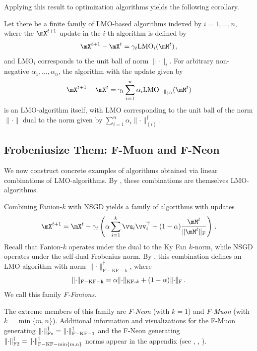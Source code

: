 \documentclass[pmlr]{jmlr}%
\newcommand{\norm}[1]{\lVert #1\rVert}
\DeclarePairedDelimiter{\normf}{\|}{\|_\mathrm{F}}
\DeclarePairedDelimiter{\normkfk}{\|}{\|_{\text{KF-}k}}
\DeclarePairedDelimiter{\normfstar}{\|}{\|_\mathrm{F*}}
\DeclarePairedDelimiter{\normftwo}{\|}{\|_\mathrm{F2}}
\begin{document}
 Applying this result to optimization algorithms yields the following corollary.
 
 \begin{corollary}\label{corollary:lin_comb_alg}
   Let there be a finite family of LMO-based algorithms indexed by $i = 1,\dots,n$, where the $\mX^{t + 1}$ update in the $i$-th algorithm is defined by
   \[
   \mX^{t + 1} - \mX^{t} = \gamma_t \mathrm{LMO}_{i}(\mM^{t})\,,
   \]
   and $\mathrm{LMO}_i$ corresponds to the unit ball of norm $\norm{\cdot}_i$. For arbitrary non-negative $\alpha_1,\dots,\alpha_n$, the algorithm with the update given by
   \[
   \mX^{t + 1} - \mX^{t} = \gamma_t \sum_{i = 1}^n \alpha_i \mathrm{LMO}_{\norm{\cdot}_{(i)}}(\mM^t)
   \]
   is an LMO-algorithm itself, with LMO corresponding to the unit ball of the norm $\norm{\cdot}$ dual to the norm given by $\sum_{i = 1}^n \alpha_i \norm{\cdot}_{(i)}^\dagger$.
 \end{corollary}
 
 \subsection{Frobeniusize Them: F-Muon and F-Neon}
 We now construct concrete examples of algorithms obtained via linear combinations of LMO-algorithms. By , these combinations are themselves LMO-algorithms.
 
 Combining Fanion-$k$ with NSGD yields a family of algorithms with updates
 \begin{equation}\label{eq:nsgd_muon_update}
     \mX^{t+1} = \mX^{t} - \gamma_t \left(\alpha \sum_{i = 1}^k \vu_i \vv_i^\top + (1-\alpha)\frac{\mM^t}{\normf{\mM^t}}\right)\,.
 \end{equation}
 Recall that Fanion-$k$ operates under the dual to the Ky Fan $k$-norm, while NSGD operates under the self-dual Frobenius norm. By , this combination defines an LMO-algorithm with norm $\norm{\cdot}_{\mathrm{F-KF-k}}^\dagger$, where
 \begin{equation}\label{eq:fkfk_norm}
   \norm{\cdot}_{\mathrm{F-KF-k}} = \alpha \normkfk{\cdot} + (1-\alpha)\normf{\cdot}\,.
 \end{equation}
 We call this family \emph{F-Fanions}.
 
 The extreme members of this family are \emph{F-Neon} (with $k = 1$) and \emph{F-Muon} (with $k = \min\{m, n\}$). Additional information and visualizations for the F-Muon generating $\normfstar{\cdot}^\dagger = \norm{\cdot}_{\mathrm{F-KF-1}}^\dagger$ and the F-Neon generating $\normftwo{\cdot}^\dagger = \norm{\cdot}_{\mathrm{F-KF-\min\{m, n\}}}^\dagger$ norms appear in the appendix (see , , ).
 
\end{document}
